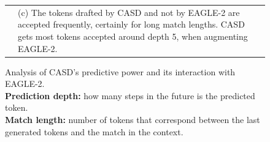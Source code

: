 \begin{landscape}
\begin{figure}
\begin{tabular}{@{}l@{}@{}l@{}@{}l@{}}
    & \hspace{0.5cm} \parbox{.27\linewidth}{\small (c) The tokens drafted by CASD and not by EAGLE-2 are accepted frequently, certainly for long match lengths. CASD gets most tokens accepted around depth 5, when augmenting EAGLE-2.} 
  \end{tabular}
  \vspace{0.2cm}
  \caption{
    Analysis of CASD's predictive power and its interaction with EAGLE-2.\\
    \textbf{Prediction depth:} how many steps in the future is the predicted token.\\
    \textbf{Match length:} number of tokens that correspond between the last generated tokens and the match in the context. \\
  }
  \label{fig:prob_casd_accept}
  \label{fig:prob_casd_eagle_overlap}
\end{figure}

\end{landscape}